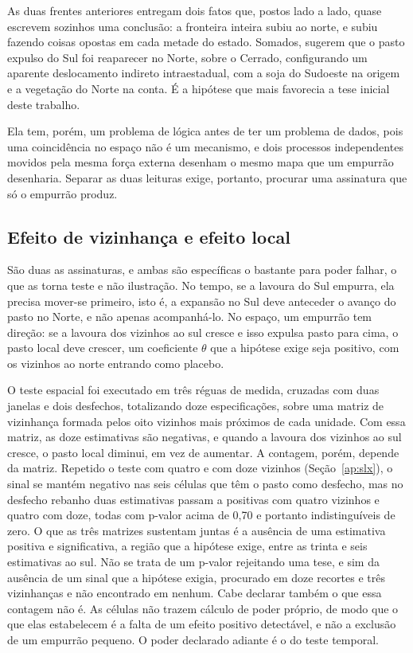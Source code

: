 As duas frentes anteriores entregam dois fatos que, postos lado a lado, quase
escrevem sozinhos uma conclusão: a fronteira inteira subiu ao norte, e subiu
fazendo coisas opostas em cada metade do estado. Somados, sugerem que o pasto
expulso do Sul foi reaparecer no Norte, sobre o Cerrado, configurando um
aparente deslocamento indireto intraestadual, com a soja do Sudoeste na
origem e a vegetação do Norte na conta. É a hipótese que mais favorecia a tese
inicial deste trabalho.

Ela tem, porém, um problema de lógica antes de ter um problema de dados, pois uma
coincidência no espaço não é um mecanismo, e dois processos independentes
movidos pela mesma força externa desenham o mesmo mapa que um
empurrão desenharia. Separar as duas leituras exige, portanto, procurar uma assinatura
que só o empurrão produz.

\subsection{Efeito de vizinhança e efeito local}

São duas as assinaturas, e ambas são específicas o bastante para poder falhar,
o que as torna teste e não ilustração. No tempo, se a lavoura do Sul empurra,
ela precisa mover-se primeiro, isto é, a expansão no Sul deve anteceder o avanço do
pasto no Norte, e não apenas acompanhá-lo. No espaço, um empurrão tem direção:
se a lavoura dos vizinhos ao sul cresce e isso expulsa pasto para cima, o
pasto local deve crescer, um coeficiente $\theta$ que a hipótese exige seja
positivo, com os vizinhos ao norte entrando como placebo.

O teste espacial foi executado em três réguas de medida, cruzadas com duas
janelas e dois desfechos, totalizando doze especificações, sobre uma matriz de
vizinhança formada pelos oito vizinhos mais próximos de cada unidade. Com essa
matriz, as doze estimativas são negativas, e quando a lavoura dos vizinhos ao
sul cresce, o pasto local diminui, em vez de aumentar. A contagem, porém,
depende da matriz. Repetido o teste com quatro e com doze vizinhos
(Seção~\ref{ap:slx}), o sinal se mantém negativo nas seis células que têm o
pasto como desfecho, mas no desfecho rebanho duas estimativas passam a positivas
com quatro vizinhos e quatro com doze, todas com p-valor acima de 0,70 e
portanto indistinguíveis de zero. O que as três matrizes sustentam juntas é a
ausência de uma estimativa positiva e significativa, a região que a hipótese
exige, entre as trinta e seis estimativas ao sul. Não se trata de um p-valor
rejeitando uma tese, e sim da ausência de um sinal que a hipótese exigia,
procurado em doze recortes e três vizinhanças e não encontrado em nenhum. Cabe
declarar também o que essa contagem não é. As células não trazem cálculo de
poder próprio, de modo que o que elas estabelecem é a falta de um efeito
positivo detectável, e não a exclusão de um empurrão pequeno. O poder declarado
adiante é o do teste temporal.

